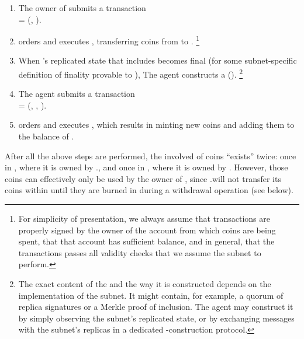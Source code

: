 \begin{enumerate}

    \item The owner of  submits a transaction\\
     = (, ).
    
    \item {} orders and executes , transferring  coins from  to \sa.%
    \footnote{For simplicity of presentation, we always assume that transactions are properly signed by the owner of the account from which coins are being spent,
    that that account has sufficient balance, and in general, that the transactions passes all validity checks that we assume the subnet to perform.}
    
    \item When 's replicated state that includes  becomes final (for some subnet-specific definition of finality provable to ),
    The \ipc agent constructs a {\pof}().%
    \footnote{The exact content of the \pof and the way it is constructed depends on the implementation of the subnet.
    It might contain, for example, a quorum of replica signatures or a Merkle proof of inclusion.
    The \ipc agent may construct it by simply observing the subnet's replicated state, or by exchanging messages with the subnet's replicas in a dedicated \pof-construction protocol.}
    
    \item The \ipc agent submits a transaction\\
     = (, , \pof).
    
    \item {} orders and executes , which results in minting  new coins and adding them to the balance of .
\end{enumerate}

After all the above steps are performed, the involved  of coins ``exists'' twice: once in , where it is owned by .\sa,
and once in , where it is owned by .
However, those coins can effectively only be used by the owner of ,
since .\sa will not transfer its coins within  until they are burned in  during a withdrawal operation (see below).


